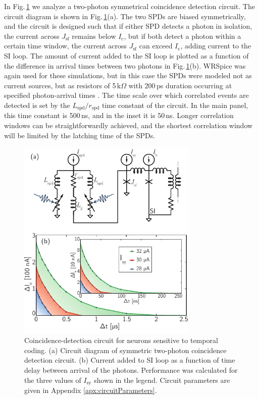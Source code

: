 \documentclass[twocolumn]{article}
\begin{document}
In Fig.\,\ref{fig:receivers_coincidence} we analyze a two-photon symmetrical coincidence detection circuit. The circuit diagram is shown in Fig.\,\ref{fig:receivers_coincidence}(a). The two SPDs are biased symmetrically, and the circuit is designed such that if either SPD detects a photon in isolation, the current across $J_{\mathrm{sf}}$ remains below $I_{\mathrm{c}}$, but if both detect a photon within a certain time window, the current across $J_{\mathrm{sf}}$ can exceed $I_{\mathrm{c}}$, adding current to the SI loop. The amount of current added to the SI loop is plotted as a function of the difference in arrival times between two photons in Fig.\,\ref{fig:receivers_coincidence}(b). WRSpice was again used for these simulations, but in this case the SPDs were modeled not as current sources, but as resistors of 5\,k$\Omega$ with 200\,ps duration occurring at specified photon-arrival times \cite{yake2007}. The time scale over which correlated events are detected is set by the $L_{\mathrm{spd}}/r_{\mathrm{spd}}$ time constant of the circuit. In the main panel, this time constant is 500\,ns, and in the inset it is 50\,ns. Longer correlation windows can be straightforwardly achieved, and the shortest correlation window will be limited by the latching time of the SPDs.
\begin{figure}[t!]
	\centerline{\includegraphics[width=8.6cm]{_receivers_coincidence_small.pdf}}
	\caption{\label{fig:receivers_coincidence}Coincidence-detection circuit for neurons sensitive to temporal coding. (a) Circuit diagram of symmetric two-photon coincidence detection circuit. (b) Current added to SI loop as a function of time delay between arrival of the photons. Performance was calculated for the three values of $I_{\mathrm{sy}}$ shown in the legend. Circuit parameters are given in Appendix \ref{apx:circuitParameters}.}
\end{figure}
\end{document}
